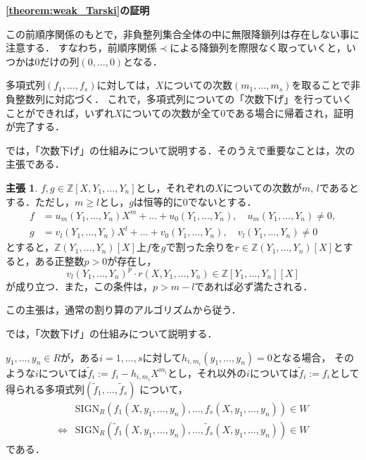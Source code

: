\documentclass[uplatex, dvipdfmx]{jsarticle}
\makeatletter
\renewenvironment{proof}[1][\proofname]{\par
  \pushQED{\qed}%
  \normalfont \topsep6\p@\@plus6\p@\relax
  \trivlist
  \item\relax
  {\bfseries
  #1\@addpunct{.}}\hspace\labelsep\ignorespaces
}{%
  \popQED\endtrivlist\@endpefalse
}
\newcommand{\Z}{\mathbb{Z}}
\newcommand{\SIGN}{\mathrm{SIGN}}
\theoremstyle{definition}
\newtheorem*{claim*}{主張}
\renewcommand{\proofname}{\textbf{証明}}
\makeatother
\begin{document}
\begin{proof}[\cref{theorem:weak_Tarski}の証明]
     この前順序関係のもとで，非負整列集合全体の中に無限降鎖列は存在しない事に注意する．
     すなわち，前順序関係$\prec$による降鎖列を際限なく取っていくと，いつかは$0$だけの列$(0,\dots, 0)$となる．

     多項式列$(f_1, \dots, f_s)$に対しては，$X$についての次数$(m_1, \dots, m_s)$を取ることで非負整数列に対応づく．
     これで，多項式列についての「次数下げ」を行っていくことができれば，いずれ$X$についての次数が全て$0$である場合に帰着され，証明が完了する．

     では，「次数下げ」の仕組みについて説明する．そのうえで重要なことは，次の主張である．  
     \begin{claim*}
          $ f , g \in \Z[X, Y_1, \dots, Y_n]$とし，それぞれの$X$についての次数が$m$, $l$であるとする．ただし，$m \geq l$とし，$g$は恒等的に$0$でないとする．
          \begin{align*}
               f &= u_m(Y_1, \dots, Y_n)X^m + \dots + u_0(Y_1, \dots, Y_n), \quad u_m(Y_1, \dots, Y_n) \neq 0, \\
               g &= v_l(Y_1, \dots, Y_n)X^l + \dots + v_0(Y_1, \dots, Y_n), \quad v_l(Y_1, \dots, Y_n) \neq 0
          \end{align*}
          とすると，$\Z(Y_1, \dots, Y_n)[X]$上$f$を$g$で割った余りを$r \in \Z(Y_1, \dots, Y_n)[X]$とすると，ある正整数$p>0$が存在し，
          \[
               v_l(Y_1, \dots, Y_n)^p \cdot r(X,Y_1, \dots, Y_n) \in \Z[Y_1, \dots, Y_n][X]
          \]
          が成り立つ．また，この条件は，$p>m-l$であれば必ず満たされる．
     \end{claim*}
     この主張は，通常の割り算のアルゴリズムから従う．

     では，「次数下げ」の仕組みについて説明する．

     $y_1, \dots, y_n \in R$が，ある$i=1, \dots, s$に対して$h_{i, m_i}(y_1, \dots, y_n) = 0$となる場合，
     そのような$i$については$\tilde{f}_i := f_i - h_{i, m_i}X^{m_i}$とし，それ以外の$i$については$\tilde{f}_i := f_i$として得られる多項式列$(\tilde{f}_1, \dots, \tilde{f}_s)$
     について，
     \begin{align*}
          &\SIGN_R(f_1(X,y_1, \dots, y_n), \dots, f_s(X,y_1, \dots, y_n)) \in W\\
          \iff &\SIGN_R(\tilde{f}_1(X,y_1, \dots, y_n), \dots, \tilde{f}_s(X,y_1, \dots, y_n)) \in W
     \end{align*}
     である．


\end{proof}
\end{document}
